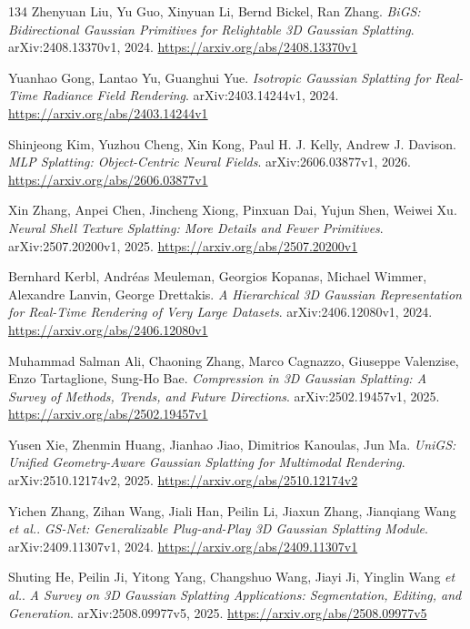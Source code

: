 \documentclass[11pt,a4paper]{article}
\begin{document}
\begin{thebibliography}{134}
Zhenyuan Liu, Yu Guo, Xinyuan Li, Bernd Bickel, Ran Zhang.
\newblock \emph{BiGS: Bidirectional Gaussian Primitives for Relightable 3D Gaussian Splatting}.
\newblock arXiv:2408.13370v1, 2024.
\newblock \url{https://arxiv.org/abs/2408.13370v1}

Yuanhao Gong, Lantao Yu, Guanghui Yue.
\newblock \emph{Isotropic Gaussian Splatting for Real-Time Radiance Field Rendering}.
\newblock arXiv:2403.14244v1, 2024.
\newblock \url{https://arxiv.org/abs/2403.14244v1}

Shinjeong Kim, Yuzhou Cheng, Xin Kong, Paul H. J. Kelly, Andrew J. Davison.
\newblock \emph{MLP Splatting: Object-Centric Neural Fields}.
\newblock arXiv:2606.03877v1, 2026.
\newblock \url{https://arxiv.org/abs/2606.03877v1}

Xin Zhang, Anpei Chen, Jincheng Xiong, Pinxuan Dai, Yujun Shen, Weiwei Xu.
\newblock \emph{Neural Shell Texture Splatting: More Details and Fewer Primitives}.
\newblock arXiv:2507.20200v1, 2025.
\newblock \url{https://arxiv.org/abs/2507.20200v1}

Bernhard Kerbl, Andr\'{e}as Meuleman, Georgios Kopanas, Michael Wimmer, Alexandre Lanvin, George Drettakis.
\newblock \emph{A Hierarchical 3D Gaussian Representation for Real-Time Rendering of Very Large Datasets}.
\newblock arXiv:2406.12080v1, 2024.
\newblock \url{https://arxiv.org/abs/2406.12080v1}

Muhammad Salman Ali, Chaoning Zhang, Marco Cagnazzo, Giuseppe Valenzise, Enzo Tartaglione, Sung-Ho Bae.
\newblock \emph{Compression in 3D Gaussian Splatting: A Survey of Methods, Trends, and Future Directions}.
\newblock arXiv:2502.19457v1, 2025.
\newblock \url{https://arxiv.org/abs/2502.19457v1}

Yusen Xie, Zhenmin Huang, Jianhao Jiao, Dimitrios Kanoulas, Jun Ma.
\newblock \emph{UniGS: Unified Geometry-Aware Gaussian Splatting for Multimodal Rendering}.
\newblock arXiv:2510.12174v2, 2025.
\newblock \url{https://arxiv.org/abs/2510.12174v2}

Yichen Zhang, Zihan Wang, Jiali Han, Peilin Li, Jiaxun Zhang, Jianqiang Wang \emph{et al.}.
\newblock \emph{GS-Net: Generalizable Plug-and-Play 3D Gaussian Splatting Module}.
\newblock arXiv:2409.11307v1, 2024.
\newblock \url{https://arxiv.org/abs/2409.11307v1}

Shuting He, Peilin Ji, Yitong Yang, Changshuo Wang, Jiayi Ji, Yinglin Wang \emph{et al.}.
\newblock \emph{A Survey on 3D Gaussian Splatting Applications: Segmentation, Editing, and Generation}.
\newblock arXiv:2508.09977v5, 2025.
\newblock \url{https://arxiv.org/abs/2508.09977v5}


\end{thebibliography}
\end{document}
